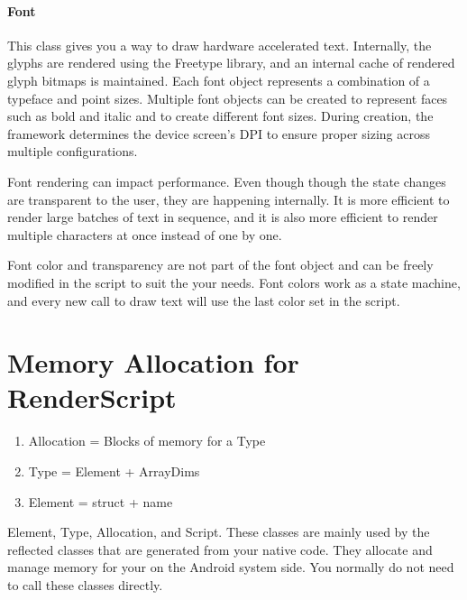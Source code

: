 \paragraph{Font}
This class gives you a way to draw hardware accelerated text. Internally, the glyphs are rendered using the Freetype library, and an internal cache of rendered glyph bitmaps is maintained. Each font object represents a combination of a typeface and point sizes. Multiple font objects can be created to represent faces such as bold and italic and to create different font sizes. During creation, the framework determines the device screen's DPI to ensure proper sizing across multiple configurations.

Font rendering can impact performance. Even though though the state changes are transparent to the user, they are happening internally. It is more efficient to render large batches of text in sequence, and it is also more efficient to render multiple characters at once instead of one by one.

Font color and transparency are not part of the font object and can be freely modified in the script to suit the your needs. Font colors work as a state machine, and every new call to draw text will use the last color set in the script.


\section{Memory Allocation for RenderScript}
\label{MemoryAllocation}
\begin{enumerate}
	\item Allocation = Blocks of memory for a Type 
	\item Type = Element + ArrayDims 
	\item Element = struct + name
\end{enumerate}

Element, Type, Allocation, and Script. These classes are mainly used by the reflected classes that are generated from your native \RS{} code. They allocate and manage memory for your \RS{} on the Android system side. You normally do not need to call these classes directly.

